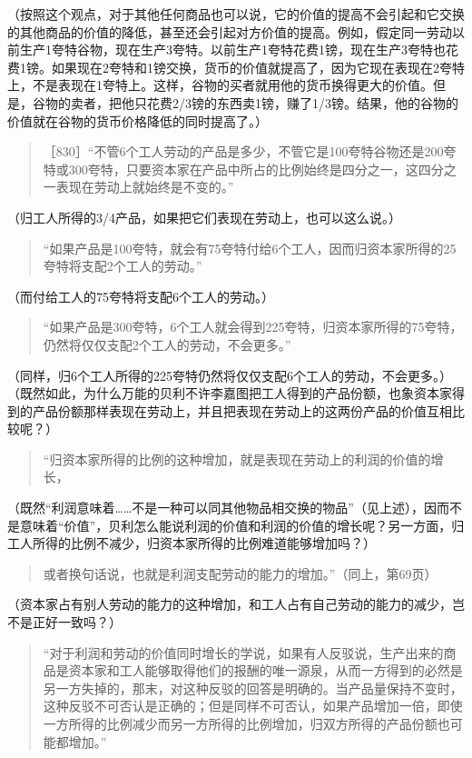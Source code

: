 （按照这个观点，对于其他任何商品也可以说，它的价值的提高不会引起和它交换的其他商品的价值的降低，甚至还会引起对方价值的提高。例如，假定同一劳动以前生产1夸特谷物，现在生产3夸特。以前生产1夸特花费1镑，现在生产3夸特也花费1镑。如果现在2夸特和1镑交换，货币的价值就提高了，因为它现在表现在2夸特上，不是表现在1夸特上。这样，谷物的买者就用他的货币换得更大的价值。但是，谷物的卖者，把他只花费2/3镑的东西卖1镑，赚了1/3镑。结果，他的谷物的价值就在谷物的货币价格降低的同时提高了。）

\begin{quote}{［830］“不管6个工人劳动的产品是多少，不管它是100夸特谷物还是200夸特或300夸特，只要资本家在产品中所占的比例始终是四分之一，这四分之一表现在劳动上就始终是不变的。”}\end{quote}

（归工人所得的3/4产品，如果把它们表现在劳动上，也可以这么说。）

\begin{quote}{“如果产品是100夸特，就会有75夸特付给6个工人，因而归资本家所得的25夸特将支配2个工人的劳动。”}\end{quote}

（而付给工人的75夸特将支配6个工人的劳动。）

\begin{quote}{“如果产品是300夸特，6个工人就会得到225夸特，归资本家所得的75夸特，仍然将仅仅支配2个工人的劳动，不会更多。”}\end{quote}

（同样，归6个工人所得的225夸特仍然将仅仅支配6个工人的劳动，不会更多。）（既然如此，为什么万能的贝利不许李嘉图把工人得到的产品份额，也象资本家得到的产品份额那样表现在劳动上，并且把表现在劳动上的这两份产品的价值互相比较呢？）

\begin{quote}{“归资本家所得的比例的这种增加，就是表现在劳动上的利润的价值的增长，}\end{quote}

（既然“利润意味着……不是一种可以同其他物品相交换的物品”（见上述），因而不是意味着“价值”，贝利怎么能说利润的价值和利润的价值的增长呢？另一方面，归工人所得的比例不减少，归资本家所得的比例难道能够增加吗？）

\begin{quote}{或者换句话说，也就是利润支配劳动的能力的增加。”（同上，第69页）}\end{quote}

（资本家占有别人劳动的能力的这种增加，和工人占有自己劳动的能力的减少，岂不是正好一致吗？）

\begin{quote}{“对于利润和劳动的价值同时增长的学说，如果有人反驳说，生产出来的商品是资本家和工人能够取得他们的报酬的唯一源泉，从而一方得到的必然是另一方失掉的，那末，对这种反驳的回答是明确的。当产品量保持不变时，这种反驳不可否认是正确的；但是同样不可否认，如果产品增加一倍，即使一方所得的比例减少而另一方所得的比例增加，归双方所得的产品份额也可能都增加。”}\end{quote}

